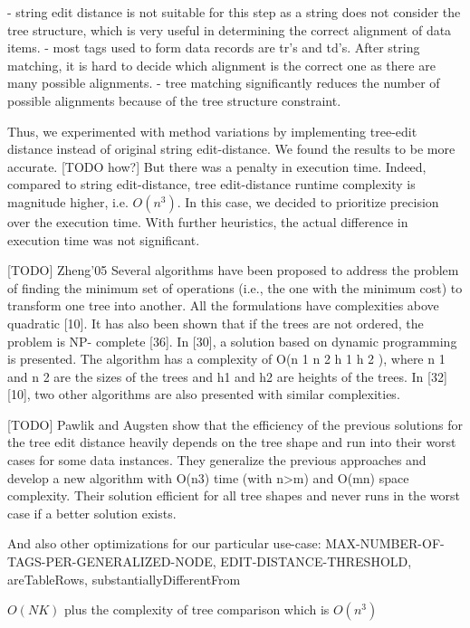 - string edit distance is not suitable for this step as a string does not consider the tree structure, which is very useful in determining the correct alignment of data items.
- most tags used to form data records are tr’s and td’s. After string matching, it is hard to decide which alignment is the correct one as there are many possible alignments.
- tree matching significantly reduces the number of possible alignments because of the tree structure constraint.

Thus, we experimented with method variations by implementing tree-edit distance instead of original string edit-distance. We found the results to be more accurate. [TODO how?] But there was a penalty in execution time. Indeed, compared to string edit-distance, tree edit-distance runtime complexity is magnitude higher, i.e. $O(n^3)$. In this case, we decided to prioritize precision over the execution time. With further heuristics, the actual difference in execution time was not significant.

[TODO] Zheng'05
Several algorithms have been proposed to address the problem of
finding the minimum set of operations (i.e., the one with the
minimum cost) to transform one tree into another. All the
formulations have complexities above quadratic [10]. It has also
been shown that if the trees are not ordered, the problem is NP-
complete [36]. In [30], a solution based on dynamic programming
is presented. The algorithm has a complexity of O(n 1 n 2 h 1 h 2 ),
where n 1 and n 2 are the sizes of the trees and h1 and h2 are heights
of the trees. In [32][10], two other algorithms are also presented
with similar complexities.

[TODO] Pawlik and Augsten \cite{pawlik2011a} show that the efficiency of the previous solutions for the tree edit distance heavily depends on the tree shape and run into their worst cases for some data instances. They generalize the previous approaches and develop a new algorithm with O(n3) time (with n>m) and O(mn) space complexity. Their solution efficient for all tree shapes and never runs in the worst case if a better solution exists.

And also other optimizations for our particular use-case: MAX-NUMBER-OF-TAGS-PER-GENERALIZED-NODE, EDIT-DISTANCE-THRESHOLD, areTableRows, substantiallyDifferentFrom

$O(N K)$ plus the complexity of tree comparison which is $O(n^3)$



